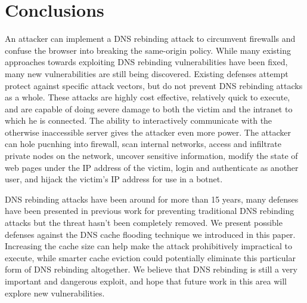 \section{Conclusions}
\label{sec:conc}

An attacker can implement a DNS rebinding attack to circumvent firewalls and confuse the browser into breaking the same-origin policy. 
While many existing approaches towards exploiting DNS rebinding vulnerabilities have been fixed, many new vulnerabilities are still being discovered. Existing defenses attempt protect against specific attack vectors, but do not prevent DNS rebinding attacks as a whole. These attacks are highly cost effective, relatively quick to execute, and are capable of doing severe damage to both the victim and the intranet to which he is connected. The ability to interactively communicate with the otherwise inaccessible server gives the attacker even more power. The attacker can hole pucnhing into firewall, scan internal networks, access and infiltrate private nodes on the network, uncover sensitive information, modify the state of web pages under the IP address of the victim, login and authenticate as another user, and hijack the victim's IP address for use in a botnet.

DNS rebinding attacks have been around for more than 15 years, many defenses have been presented in previous work for preventing traditional DNS rebinding attacks but the threat hasn't been completely removed. We present possible defenses against the DNS cache flooding technique we introduced in this paper. Increasing the cache size can help make the attack prohibitively impractical to execute, while smarter cache eviction could potentially eliminate this particular form of DNS rebinding altogether. We believe that DNS rebinding is still a very important and dangerous exploit, and hope that future work in this area will explore new vulnerabilities.
